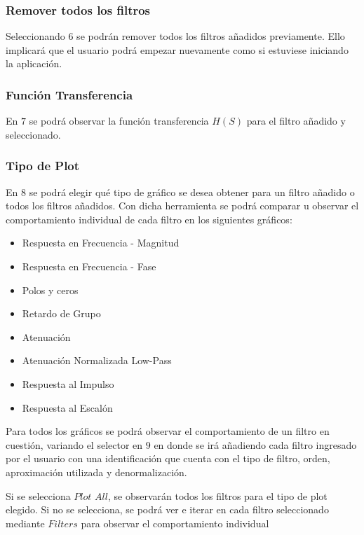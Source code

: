\subsubsection{Remover todos los filtros}

Seleccionando $6$ se podrán remover todos los filtros añadidos previamente. Ello implicará que el usuario podrá empezar nuevamente
como si estuviese iniciando la aplicación.

\subsubsection{Función Transferencia}

En $7$ se podrá observar la función transferencia $H(S)$ para el filtro añadido y seleccionado.

\subsubsection{Tipo de Plot}

En $8$ se podrá elegir qué tipo de gráfico se desea obtener para un filtro añadido o todos los filtros añadidos.
Con dicha herramienta se podrá comparar u observar el comportamiento individual de cada filtro en los siguientes gráficos:

\begin{itemize}
	\item Respuesta en Frecuencia - Magnitud
	\item Respuesta en Frecuencia - Fase
	\item Polos y ceros
	\item Retardo de Grupo
	\item Atenuación
	\item Atenuación Normalizada Low-Pass
	\item Respuesta al Impulso
	\item Respuesta al Escalón
\end{itemize}

Para todos los gráficos se podrá observar el comportamiento de un filtro en cuestión, variando el selector en $9$ en donde 
se irá añadiendo cada filtro ingresado por el usuario con una identificación que cuenta con el tipo de filtro, orden, aproximación
utilizada y denormalización.

Si se selecciona $Plot$ $All$, se observarán todos los filtros para el tipo de plot elegido. Si no se selecciona,
se podrá ver e iterar en cada filtro seleccionado mediante $Filters$ para observar el comportamiento individual

